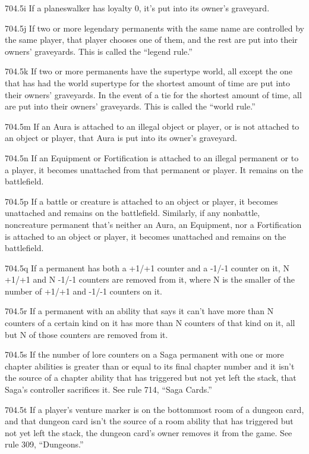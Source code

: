 704.5i If a planeswalker has loyalty 0, it’s put into its owner’s graveyard.

704.5j If two or more legendary permanents with the same name are controlled by the same player, that player chooses one of them, and the rest are put into their owners’ graveyards. This is called the “legend rule.”

704.5k If two or more permanents have the supertype world, all except the one that has had the world supertype for the shortest amount of time are put into their owners’ graveyards. In the event of a tie for the shortest amount of time, all are put into their owners’ graveyards. This is called the “world rule.”

704.5m If an Aura is attached to an illegal object or player, or is not attached to an object or player, that Aura is put into its owner’s graveyard.

704.5n If an Equipment or Fortification is attached to an illegal permanent or to a player, it becomes unattached from that permanent or player. It remains on the battlefield.

704.5p If a battle or creature is attached to an object or player, it becomes unattached and remains on the battlefield. Similarly, if any nonbattle, noncreature permanent that’s neither an Aura, an Equipment, nor a Fortification is attached to an object or player, it becomes unattached and remains on the battlefield.

704.5q If a permanent has both a +1/+1 counter and a -1/-1 counter on it, N +1/+1 and N -1/-1 counters are removed from it, where N is the smaller of the number of +1/+1 and -1/-1 counters on it.

704.5r If a permanent with an ability that says it can’t have more than N counters of a certain kind on it has more than N counters of that kind on it, all but N of those counters are removed from it.

704.5s If the number of lore counters on a Saga permanent with one or more chapter abilities is greater than or equal to its final chapter number and it isn’t the source of a chapter ability that has triggered but not yet left the stack, that Saga’s controller sacrifices it. See rule 714, “Saga Cards.”

704.5t If a player’s venture marker is on the bottommost room of a dungeon card, and that dungeon card isn’t the source of a room ability that has triggered but not yet left the stack, the dungeon card’s owner removes it from the game. See rule 309, “Dungeons.”


